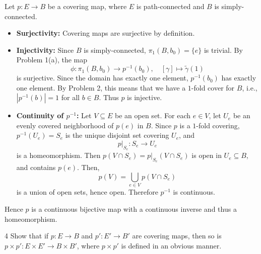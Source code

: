 \documentclass[12pt]{article}
\begin{document}
\begin{solution}
    \bbni
    
    Let $p: E\to B$ be a covering map, where $E$ is path-connected and $B$ is simply-connected. 
    \begin{itemize}
        \item \textbf{Surjectivity:} Covering maps are surjective by definition. 
        \item \textbf{Injectivity:} Since $B$ is simply-connected, $\pi_1(B, b_0) = \{e\}$ is trivial. By Problem 1(a), the map 
        \[
            \phi: \pi_1(B, b_0) \to p^{-1}(b_0), \quad [\gamma] \mapsto
            \widetilde{\gamma}(1)
        \] 
        is surjective. Since the domain has exactly one element, $p^{-1}(b_0)$ has exactly one element. By Problem 2, this means that we have a $1$-fold cover for $B$, i.e.,  $|p^{-1}(b)| = 1$ for all $b \in B$. Thus $p$ is injective. 
        
        \item \textbf{Continuity of $p^{-1}$:}  
        Let $V \subseteq E$ be an open set. For each $e \in V$, let $U_e$ be an evenly covered neighborhood of $p(e)$ in $B$. Since $p$ is a $1$-fold covering, $p^{-1}(U_e) = S_e$ is the unique disjoint set covering $U_e$, and
        \[
            p|_{S_e} : S_e \to U_e
        \]
        is a homeomorphism. 
        Then $p(V \cap S_e) = p|_{S_e}(V \cap S_e)$ is open in $U_e \subseteq B$, and contains $p(e)$. Then,
        \[
            p(V) = \bigcup_{e \in V} p(V \cap S_e)
        \]
        is a union of open sets, hence open. Therefore $p^{-1}$ is continuous.
    \end{itemize}

    Hence $p$ is a continuous bijective map with a continuous inverse and thus a homeomorphism. 
\end{solution}

\newpage 

\begin{problem}{4}
     Show that if $p: E \to B$ and $p': E' \to B'$ are covering maps, then so is $p \times p': E \times E' \to B \times B'$, where $p \times p'$ is defined in an obvious manner.
\end{problem}
\end{document}
